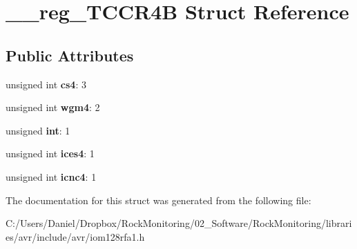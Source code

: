 \hypertarget{struct____reg___t_c_c_r4_b}{}\section{\+\_\+\+\_\+reg\+\_\+\+T\+C\+C\+R4B Struct Reference}
\label{struct____reg___t_c_c_r4_b}
\subsection*{Public Attributes}
\begin{DoxyCompactItemize}
\item 
unsigned int {\bfseries cs4}\+: 3\hypertarget{struct____reg___t_c_c_r4_b_a3d50f5a0440c1caee97708fafcc898a4}{}\label{struct____reg___t_c_c_r4_b_a3d50f5a0440c1caee97708fafcc898a4}

\item 
unsigned int {\bfseries wgm4}\+: 2\hypertarget{struct____reg___t_c_c_r4_b_a4524f273ed752ea93614512ef80872c0}{}\label{struct____reg___t_c_c_r4_b_a4524f273ed752ea93614512ef80872c0}

\item 
unsigned {\bfseries int}\+: 1\hypertarget{struct____reg___t_c_c_r4_b_a90093cb96541fbb679f629600aef0ba9}{}\label{struct____reg___t_c_c_r4_b_a90093cb96541fbb679f629600aef0ba9}

\item 
unsigned int {\bfseries ices4}\+: 1\hypertarget{struct____reg___t_c_c_r4_b_abcf2354937dc4eff3f045389c6cf0bf5}{}\label{struct____reg___t_c_c_r4_b_abcf2354937dc4eff3f045389c6cf0bf5}

\item 
unsigned int {\bfseries icnc4}\+: 1\hypertarget{struct____reg___t_c_c_r4_b_a46509f2bafe7ad7852a2a6b3183b48aa}{}\label{struct____reg___t_c_c_r4_b_a46509f2bafe7ad7852a2a6b3183b48aa}

\end{DoxyCompactItemize}


The documentation for this struct was generated from the following file\+:\begin{DoxyCompactItemize}
\item 
C\+:/\+Users/\+Daniel/\+Dropbox/\+Rock\+Monitoring/02\+\_\+\+Software/\+Rock\+Monitoring/libraries/avr/include/avr/iom128rfa1.\+h\end{DoxyCompactItemize}
